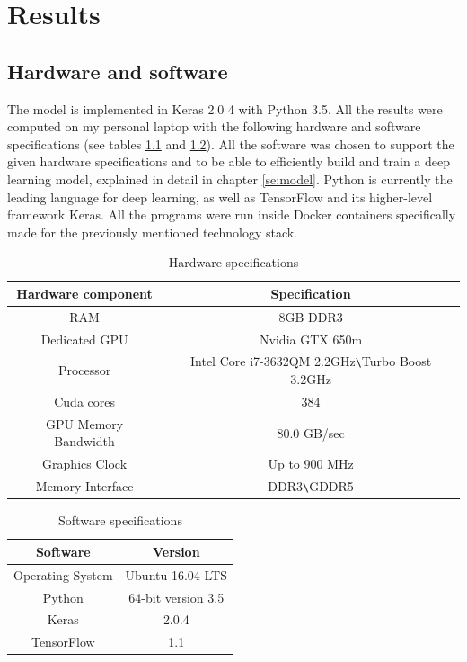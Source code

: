 \documentclass[times, utf8, diplomski]{fer}
\begin{document}
\chapter{Results}
\label{se:results}

\section{Hardware and software}
The model is implemented in Keras 2.0 4 with Python 3.5. All the results were computed on my personal laptop with the following hardware and software specifications (see tables \ref{tb:hardware_specifications} and \ref{tb:software_specifications}). All the software was chosen to support the given hardware specifications and to be able to efficiently build and train a deep learning model, explained in detail in chapter \ref{se:model}. Python is currently the leading language for deep learning, as well as TensorFlow and its higher-level framework Keras. All the programs were run inside Docker \citep{docker} containers specifically made for the previously mentioned technology stack.

\begin{table}
\centering
\caption{Hardware specifications}
\label{tb:hardware_specifications}
\begin{tabular}{cc}
\hline 
Hardware component & Specification \\ \hline 
RAM & 8GB DDR3 \\ 
Dedicated GPU & Nvidia GTX 650m \\ 
Processor & Intel Core i7-3632QM 2.2GHz\texttt{\textbackslash}Turbo Boost 3.2GHz\\
Cuda cores & 384 \\
GPU Memory Bandwidth & 80.0 GB/sec\\
Graphics Clock & Up to 900 MHz \\
Memory Interface & DDR3\texttt{\textbackslash}GDDR5 \\
\hline 
\end{tabular} 
\end{table}

\begin{table}
\centering
\caption{Software specifications}
\label{tb:software_specifications}
\begin{tabular}{cc}
\hline 
Software & Version \\ \hline 
Operating System & Ubuntu 16.04 LTS \\ 
Python & 64-bit version 3.5 \\ 
Keras & 2.0.4 \\
TensorFlow & 1.1 \\
\hline 
\end{tabular} 
\end{table}
\end{document}
